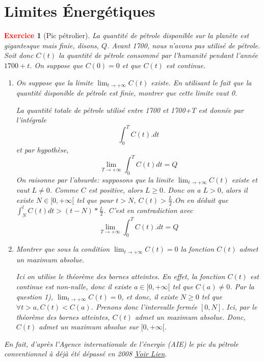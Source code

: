 \documentclass[11pt]{article}
\theoremstyle{mythmstyle}
\newtheorem{exo}{\textcolor{red}{\textbf{Exercice}}}
\begin{document}
 
\section{Limites Énergétiques}

\begin{exo}[Pic pétrolier]
La quantité de pétrole disponible sur la planète est gigantesque mais finie, disons, $Q$. Avant 1700, nous n'avons pas utilisé de pétrole. Soit  donc  $C(t)$ la quantité de pétrole consommé  par l'humanité pendant l'année $1700+t$. On suppose que  $C(0)=0$ et que $C(t)$ est continue.
\begin{enumerate}
    \item On suppose que la limite $\lim_{t\to +\infty} C(t)$ existe. En utilisant le fait que la quantité disponible de pétrole est finie, montrer que cette limite vaut 0.
   
   
  \begin{solution}
  La quantité totale de pétrole utilisé entre 1700 et 1700+T est donnée par l'intégrale
    $$
    \int_{0}^T C(t).dt
    $$
    et par hypothèse, 
    $$
    \lim_{T\to +\infty}\int_{0}^T C(t)dt=Q
    $$
    On raisonne par l'absurde:
 supposons que la limite $\lim_{t\to +\infty} C(t)$ existe et  vaut $L \neq 0$. Comme $C$ est positive, alors $L\geq 0$. Donc on a $L>0$, alors il existe $N\in [0, +\infty[$ tel que pour $t>N$, $C(t)>\frac L2$.On en déduit que $\int_{N}^{t}C(t)dt> (t-N)*\frac L2$. C'est en contradiction avec  $$
    \lim_{T\to +\infty}\int_{0}^T C(t).dt=Q
    $$
\end{solution}
    
    
 \item Montrer que sous la condition $\lim_{t\to +\infty} C(t)=0$ la fonction $C(t)$ admet un maximum absolue.
 
\begin{solution}
  Ici on utilise le théorème des bornes atteintes. En effet, la fonction $C(t)$ est continue est non-nulle, donc il existe $a\in [0, +\infty[$ tel que $C(a)\neq 0$. Par la question 1), $\lim_{t\to +\infty} C(t)=0$, et donc, il existe $N\geq 0$ tel que $\forall t> a, C(t)< C(a)$. Prenons donc l'intervalle fermée $[0, N]$. Ici, par le théorème des bornes atteintes, $C(t)$ admet un maximum absolue. Donc, $C(t)$ admet un maximum absolue sur $[0, +\infty[$.
\end{solution}
 
  \end{enumerate}  
  
  
\medskip
En fait, d'après l’Agence internationale de l’énergie (AIE)  le pic du pétrole conventionnel à déjà été dépassé en 2008 \href{https://www.lemonde.fr/blog/petrole/2019/02/04/pic-petrolier-probable-dici-a-2025-selon-lagence-internationale-de-lenergie/}{Voir Lien}.
\end{exo}
  
\end{document}

